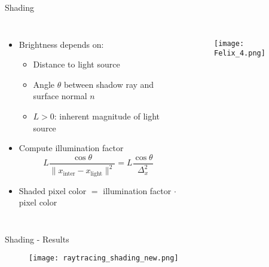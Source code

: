 \begin{frame}{Shading}
    \begin{columns}
        \begin{itemize}
        \item Brightness depends on: 
        \begin{itemize}
            \item Distance to light source
            \item Angle $\theta$ between shadow ray and surface normal $n$
            \item $L > 0$: inherent magnitude of light source
        \end{itemize}
        \item Compute illumination factor 
        $$
        L \frac{\cos \theta}{\|x_{\text{inter}} - x_{\text{light}}\|^2}
        = L \frac{\cos \theta}{\Delta_x^2}
        $$
        \item Shaded pixel color $=$ illumination factor $\cdot$ pixel color
        \end{itemize}
        \begin{figure}
                \centering
                \texttt{[image: Felix\_4.png]}
            \end{figure}
    \end{columns}
\end{frame}

\begin{frame}{Shading - Results}
    \begin{figure}
                \centering
                \texttt{[image: raytracing\_shading\_new.png]}
            \end{figure}
\end{frame}


